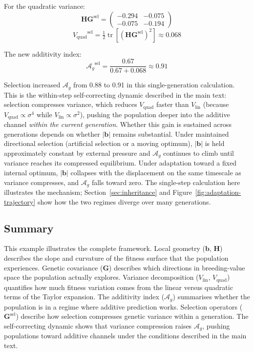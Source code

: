 \documentclass[9pt,twocolumn,twoside,lineno]{gsajnl}
\newcommand{\vect}[1]{\boldsymbol{#1}}
\newcommand{\mat}[1]{\mathbf{#1}}
\newcommand{\tr}{\ensuremath{\operatorname{tr}}\xspace}
\newcommand{\Ag}{\ensuremath{\mathcal{A}_{g}}\xspace}
\newcommand{\Gsel}{\ensuremath{\mat{G}^{\text{sel}}}\xspace}
\newcommand{\Vlin}{\ensuremath{V_{\text{lin}}}\xspace}
\newcommand{\Vquad}{\ensuremath{V_{\text{quad}}}\xspace}
\begin{document}
For the quadratic variance:
\begin{equation}
\mat{H}\Gsel = \begin{pmatrix} -0.294 & -0.075 \\ -0.075 & -0.194 \end{pmatrix}
\end{equation}
\begin{equation}
\Vquad^{\text{sel}} = \tfrac{1}{2}\tr[(\mat{H}\Gsel)^2] \approx 0.068
\end{equation}

The new additivity index:
\begin{equation}
\Ag^{\text{sel}} = \frac{0.67}{0.67 + 0.068} \approx 0.91
\end{equation}

Selection increased \Ag from 0.88 to 0.91 in this single-generation calculation. This is the within-step self-correcting dynamic described in the main text: selection compresses variance, which reduces $\Vquad$ faster than $\Vlin$ (because $\Vquad \propto \sigma^4$ while $\Vlin \propto \sigma^2$), pushing the population deeper into the additive channel \emph{within the current generation}. Whether this gain is sustained across generations depends on whether $|\vect{b}|$ remains substantial. Under maintained directional selection (artificial selection or a moving optimum), $|\vect{b}|$ is held approximately constant by external pressure and \Ag continues to climb until variance reaches its compressed equilibrium. Under adaptation toward a fixed internal optimum, $|\vect{b}|$ collapses with the displacement on the same timescale as variance compresses, and \Ag falls toward zero. The single-step calculation here illustrates the mechanism; Section~\ref{sec:inheritance} and Figure~\ref{fig:adaptation-trajectory} show how the two regimes diverge over many generations.

\subsection{Summary}

This example illustrates the complete framework. Local geometry ($\vect{b}$, $\mat{H}$) describes the slope and curvature of the fitness surface that the population experiences. Genetic covariance ($\mat{G}$) describes which directions in breeding-value space the population actually explores. Variance decomposition ($\Vlin$, $\Vquad$) quantifies how much fitness variation comes from the linear versus quadratic terms of the Taylor expansion. The additivity index (\Ag) summarises whether the population is in a regime where additive prediction works. Selection operators ($\Gsel$) describe how selection compresses genetic variance within a generation. The self-correcting dynamic shows that variance compression raises \Ag, pushing populations toward additive channels under the conditions described in the main text.
\end{document}
